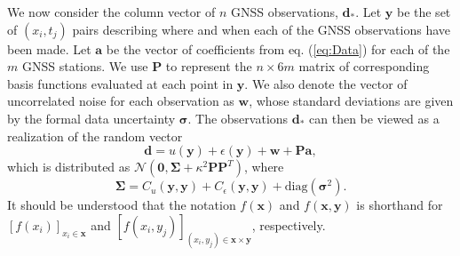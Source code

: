 \documentclass[10pt,a4paper]{article}
\begin{document}
We now consider the column vector of $n$ GNSS observations, $\bm{d}_*$. Let $\bm{y}$ be the set of $(x_i, t_j)$ pairs describing where and when each of the GNSS observations have been made. Let $\bm{a}$ be the vector of coefficients from eq. (\ref{eq:Data}) for each of the $m$ GNSS stations. We use $\bm{P}$ to represent the $n \times 6m$ matrix of corresponding basis functions evaluated at each point in $\bm{y}$. We  also denote the vector of uncorrelated noise for each observation as $\bm{w}$, whose standard deviations are given by the formal data uncertainty $\bm{\sigma}$. The observations $\bm{d}_*$ can then be viewed as a realization of the random vector
\begin{equation}
\bm{d} = u(\bm{y}) + \epsilon(\bm{y}) + \bm{w} + \bm{P}\bm{a},
\end{equation}
which is distributed as $\mathcal{N}(\bm{0},\bm{\Sigma} + \kappa^2\bm{P}\bm{P}^T)$, where
\begin{equation}\label{eq:Cd}
\bm{\Sigma} = C_u(\bm{y},\bm{y}) + C_\epsilon(\bm{y},\bm{y}) + 
              \mathrm{diag}\left(\bm{\sigma}^2\right).  
\end{equation}
It should be understood that the notation $f(\bm{x})$ and $f(\bm{x},\bm{y})$ is shorthand for $[f(x_i)]_{x_i \in \bm{x}}$ and $[f(x_i,y_j)]_{(x_i,y_j) \in \bm{x} \times \bm{y}}$, respectively. 
\end{document}
